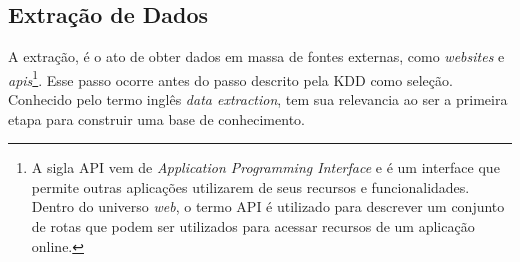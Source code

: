 \subsection{Extração de Dados}
A extração, é o ato de obter dados em massa de fontes externas, como \textit{websites} e \textit{apis}\footnote{A sigla API vem de \textit{Application Programming Interface} e é um interface que permite outras aplicações utilizarem de seus recursos e funcionalidades. Dentro do universo \textit{web}, o termo API é utilizado para descrever um conjunto de rotas que podem ser utilizados para acessar recursos de um aplicação online.}. Esse passo ocorre antes do passo descrito pela KDD como seleção. Conhecido pelo termo inglês \textit{data extraction}, tem sua relevancia ao ser a primeira etapa para construir uma base de conhecimento.

